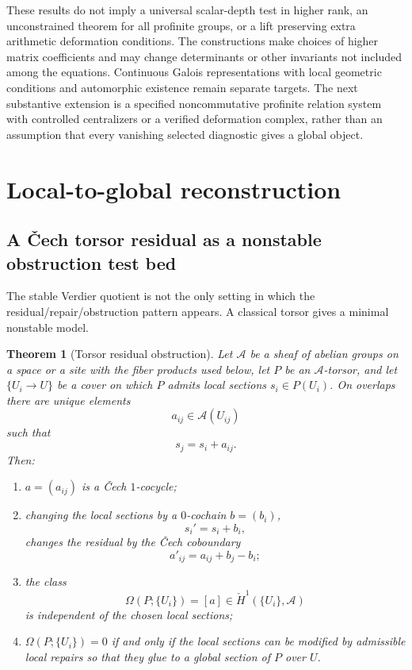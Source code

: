 \documentclass[11pt]{article}
\newtheorem{theorem}{Theorem}[section]
\theoremstyle{definition}
\theoremstyle{remark}
\begin{document}
These results do not imply a universal scalar-depth test in higher rank, an unconstrained theorem for all profinite groups, or a lift preserving extra arithmetic deformation conditions. The constructions make choices of higher matrix coefficients and may change determinants or other invariants not included among the equations. Continuous Galois representations with local geometric conditions and automorphic existence remain separate targets. The next substantive extension is a specified noncommutative profinite relation system with controlled centralizers or a verified deformation complex, rather than an assumption that every vanishing selected diagnostic gives a global object.


\section{Local-to-global reconstruction}

\subsection{A \v{C}ech torsor residual as a nonstable obstruction test bed}

The stable Verdier quotient is not the only setting in which the residual/repair/obstruction pattern appears. A classical torsor gives a minimal nonstable model.

\begin{theorem}[Torsor residual obstruction]\label{thm:torsor-obstruction}
Let $\mathcal A$ be a sheaf of abelian groups on a space or a site with the fiber products used below, let $P$ be an $\mathcal A$-torsor, and let $\{U_i\to U\}$ be a cover on which $P$ admits local sections $s_i\in P(U_i)$. On overlaps there are unique elements
\[
a_{ij}\in\mathcal A(U_{ij})
\]
such that
\[
s_j=s_i+a_{ij}.
\]
Then:
\begin{enumerate}
    \item $a=(a_{ij})$ is a \v{C}ech $1$-cocycle;
    \item changing the local sections by a $0$-cochain $b=(b_i)$,
    \[
    s_i'=s_i+b_i,
    \]
    changes the residual by the \v{C}ech coboundary
    \[
    a'_{ij}=a_{ij}+b_j-b_i;
    \]
    \item the class
    \[
    \Omega(P;\{U_i\})=[a]\in\check H^1(\{U_i\},\mathcal A)
    \]
    is independent of the chosen local sections;
    \item $\Omega(P;\{U_i\})=0$ if and only if the local sections can be modified by admissible local repairs so that they glue to a global section of $P$ over $U$.
\end{enumerate}
\end{theorem}
\end{document}
